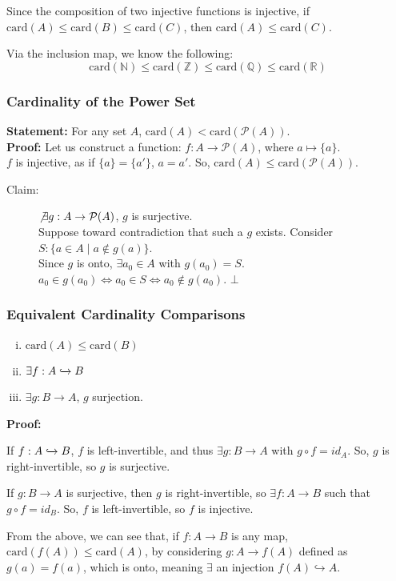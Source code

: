 \documentclass[10pt]{extarticle}
\begin{document}
    Since the composition of two injective functions is injective, if $\text{card}(A) \leq \text{card}(B) \leq \text{card}(C)$, then $\text{card}(A) \leq \text{card}(C)$.

      Via the inclusion map, we know the following:
      \[
        \text{card}(\mathbb{N}) \leq \text{card}(\mathbb{Z}) \leq \text{card}(\mathbb{Q}) \leq \text{card}(\mathbb{R})
      \] 
      \subsubsection{Cardinality of the Power Set}%
      \textbf{Statement:} For any set $A$, $\text{card}(A) < \text{card}(\mathcal{P}(A))$.\\

      \textbf{Proof:} Let us construct a function: $f: A \rightarrow \mathcal{P}(A)$, where $a \mapsto \{a\}$.\\

      $f$ is injective, as if $\{a\} = \{a'\}$, $a = a'$. So, $\text{card}(A) \leq \text{card}(\mathcal{P}(A))$.
      \begin{description}
        \item[Claim:] $\not\exists g: A\rightarrow \mathcal{P}(A)$, $g$ is surjective.\\

      Suppose toward contradiction that such a $g$ exists. Consider $S: \{a\in A \mid a\notin g(a)\}$.\\

      Since $g$ is onto, $\exists a_0\in A$ with $g(a_0) = S$. $a_0 \in g(a_0) \Leftrightarrow a_0\in S \Leftrightarrow a_0\notin g(a_0)$. $\bot$\\
      \end{description}
      \subsubsection{Equivalent Cardinality Comparisons}%
      \begin{enumerate}[(i)]
        \item $\text{card}(A) \leq \text{card}(B)$
        \item $\exists f: A\xhookrightarrow{} B$
        \item $\exists g: B\rightarrow A$, $g$ surjection.
      \end{enumerate}
      \textbf{Proof:}
      \begin{description}[font=\normalfont]
        \item[(ii) $\Rightarrow$ (iii)] If $f: A\xhookrightarrow{} B$, $f$ is left-invertible, and thus $\exists g: B\rightarrow A$ with $g\circ f = id_A$. So, $g$ is right-invertible, so $g$ is surjective.
        \item[(iii) $\Rightarrow$ (ii)] If $g: B \rightarrow A$ is surjective, then $g$ is right-invertible, so $\exists f: A\rightarrow B$ such that $g\circ f = id_B$. So, $f$ is left-invertible, so $f$ is injective.
      \end{description}
      From the above, we can see that, if $f: A\rightarrow B$ is any map, $\text{card}(f(A)) \leq \text{card}(A)$, by considering $g: A\rightarrow f(A)$ defined as $g(a) = f(a)$, which is onto, meaning $\exists$ an injection $f(A) \hookrightarrow A$.
\end{document}
